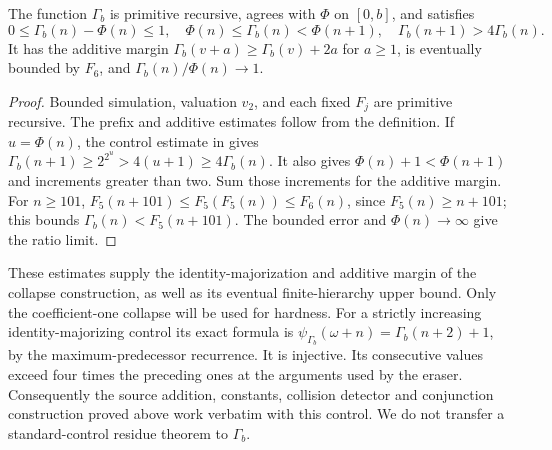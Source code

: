 \begin{lemma}\label{lem:perturbed-control}
The function $\Gamma_b$ is primitive recursive, agrees with $\Phi$ on
$[0,b]$, and satisfies
\[
 0\le\Gamma_b(n)-\Phi(n)\le1,\quad
 \Phi(n)\le\Gamma_b(n)<\Phi(n+1),\quad
 \Gamma_b(n+1)>4\Gamma_b(n).
\]
It has the additive margin
$\Gamma_b(v+a)\ge\Gamma_b(v)+2a$ for $a\ge1$, is eventually bounded
by $F_6$, and $\Gamma_b(n)/\Phi(n)\to1$.
\end{lemma}
\begin{proof}
Bounded simulation, valuation $v_2$, and each fixed $F_j$ are primitive
recursive.  The prefix and additive estimates follow from the definition.
If $u=\Phi(n)$, the control estimate in \cite{wwfoundations} gives
$\Gamma_b(n+1)\ge2^{2^u}>4(u+1)\ge4\Gamma_b(n)$.
It also gives $\Phi(n)+1<\Phi(n+1)$ and increments greater than two.
Sum those increments for the additive margin.  For $n\ge101$,
$F_5(n+101)\le F_5(F_5(n))\le F_6(n)$, since $F_5(n)\ge n+101$;
this bounds $\Gamma_b(n)<F_5(n+101)$.  The bounded error and
$\Phi(n)\to\infty$ give the ratio limit.
\end{proof}

These estimates supply the identity-majorization and additive margin of the
collapse construction, as well as its eventual finite-hierarchy upper bound.
Only the coefficient-one collapse will be used for hardness.  For a strictly
increasing identity-majorizing control its exact formula is
$\psi_{\Gamma_b}(\omega+n)=\Gamma_b(n+2)+1$, by the maximum-predecessor
recurrence.  It is injective.  Its consecutive values exceed four times the
preceding ones at the arguments used by the eraser.  Consequently the source
addition, constants, collision detector and conjunction construction proved
above work verbatim with this control.  We do not transfer a standard-control
residue theorem to $\Gamma_b$.

